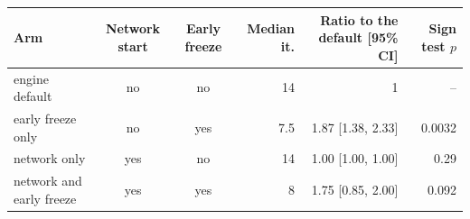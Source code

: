 \begin{tabular}{@{}lccrrr@{}}
\toprule
Arm & Network start & Early freeze & Median it. & Ratio to the default [95\% CI] & Sign test $p$ \\
\midrule
engine default & no & no & 14 & 1 & -- \\
early freeze only & no & yes & 7.5 & 1.87 [1.38, 2.33] & 0.0032 \\
network only & yes & no & 14 & 1.00 [1.00, 1.00] & 0.29 \\
network and early freeze & yes & yes & 8 & 1.75 [0.85, 2.00] & 0.092 \\
\bottomrule
\end{tabular}
